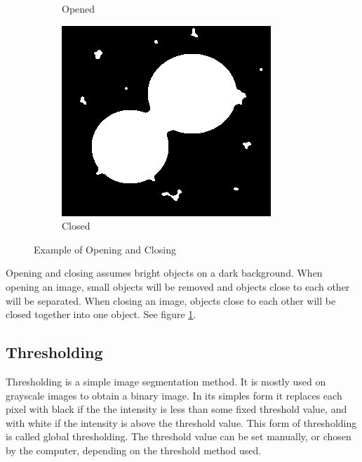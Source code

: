 \begin{figure}[ht]
\begin{subfigure}{.33\textwidth}
        \caption{Opened}
    \end{subfigure}%
    \begin{subfigure}{.33\textwidth}
        \centering
        \includegraphics[width=.99\linewidth]{images/literature/morphological/closing}
        \caption{Closed}
    \end{subfigure}
    \caption{Example of Opening and Closing}
    \label{fig:dots_opening_closing}
\end{figure}

Opening and closing assumes bright objects on a dark background. When opening an image, small objects will be removed and objects close to each other will be separated. When closing an image, objects close to each other will be closed together into one object. See figure \ref{fig:dots_opening_closing}.




\subsection{Thresholding}

Thresholding is a simple image segmentation method. It is mostly used on grayscale images to obtain a binary image. In its simples form it replaces each pixel with black if the the intensity is less than some fixed threshold value, and with white if the intensity is above the threshold value. This form of thresholding is called global thresholding.\cite{website:thresholding}\cite{website:wiki_threshold}
The threshold value can be set manually, or chosen by the computer, depending on the threshold method used. 

